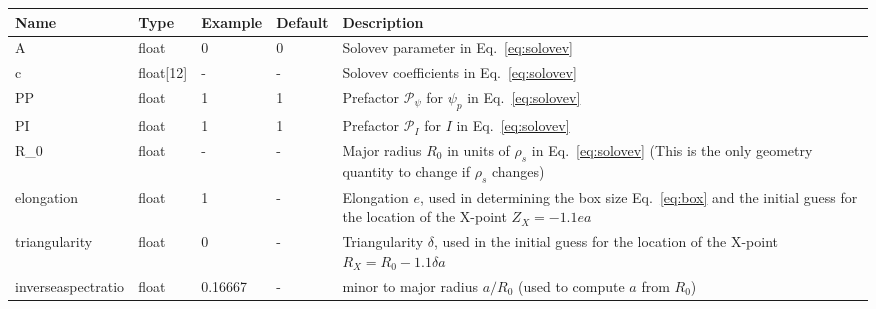 \begin{longtable}{llll>{\RaggedRight}p{7cm}}
\toprule
\rowcolor{gray!50}\textbf{Name} &  \textbf{Type} & \textbf{Example} & \textbf{Default} & \textbf{Description}  \\ \midrule
    A      & float & 0 &  0 & Solovev parameter in Eq.~\eqref{eq:solovev} \\
    c      & float[12] &  - & - & Solovev coefficients in Eq.~\eqref{eq:solovev} \\
    PP     & float & 1 &  1 & Prefactor $\mathcal P_\psi$ for $\psi_p$ in Eq.~\eqref{eq:solovev} \\
    PI     & float & 1 &  1 & Prefactor $\mathcal P_I$ for $I$ in Eq.~\eqref{eq:solovev} \\
    R\_0   & float & - & -  & Major radius $R_0$ in units of $\rho_s$ in Eq.~\eqref{eq:solovev} (This is the only geometry quantity to change if $\rho_s$ changes)\\
    elongation    & float & 1 & - & Elongation $e$, used in determining the box size Eq.~\eqref{eq:box} and the initial guess for the location of the X-point $Z_X = -1.1 ea$ \\
    triangularity & float & 0 & - & Triangularity $\delta$, used in the initial guess for the location of the X-point $R_X = R_0-1.1\delta a$ \\
    inverseaspectratio & float & 0.16667 & - & minor to major radius $a/R_0$ (used to compute $a$ from $R_0$) \\
\bottomrule
\end{longtable}

